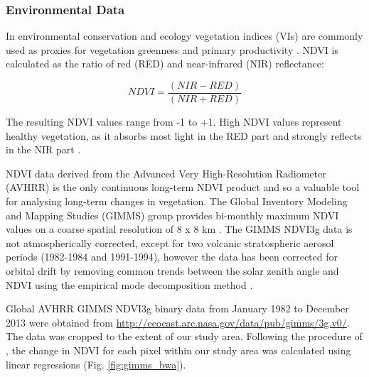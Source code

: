 \documentclass[12pt,a4paper, twoside, english]{article}
\begin{document}




\subsubsection{Environmental Data}

In environmental conservation and ecology vegetation indices (VIs) are commonly used as proxies for vegetation greenness and primary productivity \citep{Pettorelli2011, Neumann2015a}. NDVI is calculated as the ratio of red (RED) and near-infrared (NIR) reflectance:

\begin{equation}
\label{eq:ndvi}
NDVI = \frac{(NIR - RED)}{(NIR + RED)}
\end{equation}

The resulting NDVI values range from -1 to +1. High NDVI values represent healthy vegetation, as it absorbs most light in the RED part and strongly reflects in the NIR part \citep{Pettorelli2005}.

NDVI data derived from the Advanced Very High-Resolution Radiometer (AVHRR) is the only continuous long-term NDVI product and so a valuable tool for analysing long-term changes in vegetation. The Global Inventory Modeling and Mapping Studies (GIMMS) group provides bi-monthly maximum NDVI values on a coarse spatial resolution of 8 x 8 km \citep{Pinzon2014}. The GIMMS NDVI3g data is not atmospherically corrected, except for two volcanic stratospheric aerosol periods (1982-1984 and 1991-1994), however the data has been corrected for orbital drift by removing common trends between the solar zenith angle and NDVI using the empirical mode decomposition method \citep{Campo-Bescos2013}. 

Global AVHRR GIMMS NDVI3g binary data from January 1982 to December 2013 were obtained from \url{http://ecocast.arc.nasa.gov/data/pub/gimms/3g.v0/}. The data was cropped to the extent of our study area. Following the procedure of \cite{Wegmann2014}, the change in NDVI for each pixel within our study area was calculated using linear regressions (Fig. \ref{fig:gimms_bwa}).
\end{document}
